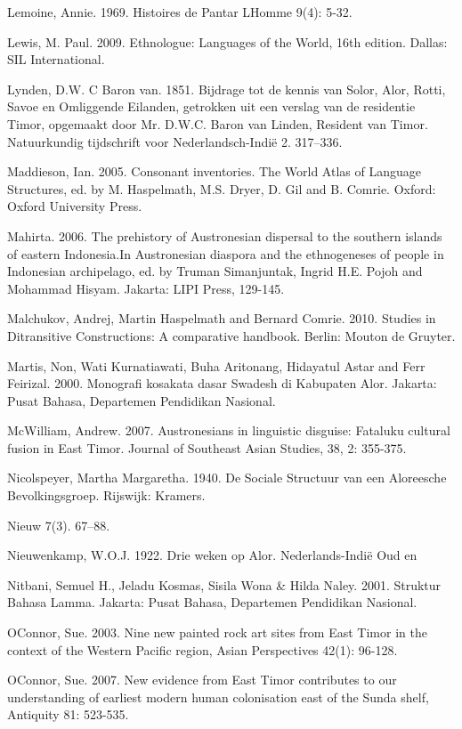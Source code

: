 Lemoine, Annie. 1969. Histoires de Pantar LHomme 9(4): 5-32.

Lewis, M. Paul. 2009. Ethnologue: Languages of the World, 16th edition. Dallas: SIL International.

Lynden, D.W. C Baron van. 1851. Bijdrage tot de kennis van Solor, Alor, Rotti, Savoe en Omliggende Eilanden, getrokken uit een verslag van de residentie Timor, opgemaakt door Mr. D.W.C. Baron van Linden, Resident van Timor. Natuurkundig tijdschrift voor Nederlandsch-Indi\"e 2. 317--336.

Maddieson, Ian. 2005. Consonant inventories. The World Atlas of Language Structures, ed. by M. Haspelmath, M.S. Dryer, D. Gil and B. Comrie. Oxford: Oxford University Press.

Mahirta. 2006. The prehistory of Austronesian dispersal to the southern islands of eastern Indonesia.In Austronesian diaspora and the ethnogeneses of people in Indonesian archipelago, ed. by Truman Simanjuntak, Ingrid H.E. Pojoh and Mohammad Hisyam. Jakarta: LIPI Press, 129-145.

Malchukov, Andrej, Martin Haspelmath and Bernard Comrie. 2010. Studies in Ditransitive Constructions: A comparative handbook. Berlin: Mouton de Gruyter.

Martis, Non, Wati Kurnatiawati, Buha Aritonang, Hidayatul Astar and Ferr Feirizal. 2000. Monografi kosakata dasar Swadesh di Kabupaten Alor. Jakarta: Pusat Bahasa, Departemen Pendidikan Nasional.

McWilliam, Andrew. 2007.  Austronesians in linguistic disguise: Fataluku cultural fusion in East Timor.  Journal of Southeast Asian Studies, 38, 2: 355-375.

Nicolspeyer, Martha Margaretha. 1940. De Sociale Structuur van een Aloreesche Bevolkingsgroep. Rijswijk: Kramers. 

Nieuw 7(3). 67--88.

Nieuwenkamp, W.O.J. 1922. Drie weken op Alor. Nederlands-Indi\"e Oud en

Nitbani, Semuel H., Jeladu Kosmas, Sisila Wona \& Hilda Naley. 2001. Struktur Bahasa Lamma. Jakarta: Pusat Bahasa, Departemen Pendidikan Nasional.

OConnor, Sue. 2003. Nine new painted rock art sites from East Timor in the context of the Western Pacific region, Asian Perspectives 42(1): 96-128.

OConnor, Sue. 2007. New evidence from East Timor contributes to our understanding of earliest modern human colonisation east of the Sunda shelf, Antiquity 81: 523-535.

